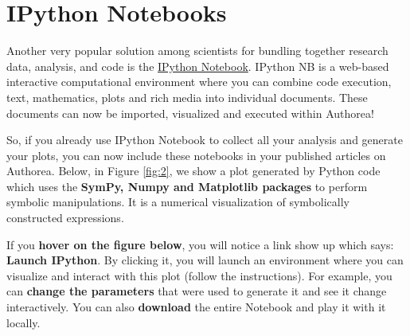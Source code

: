 \section{IPython Notebooks}
Another very popular solution among scientists for bundling together research data, analysis, and code is the \href{http://ipython.org/notebook.html}{IPython Notebook}. IPython NB is a web-based interactive computational environment where you can combine code execution, text, mathematics, plots and rich media into individual documents. These documents can now be imported, visualized and executed within Authorea!

So, if you already use IPython Notebook to collect all your analysis and generate your plots, you can now include these notebooks in your published articles on Authorea. Below, in Figure \ref{fig:2}, we show a plot generated by Python code which uses the \textbf{SymPy, Numpy and Matplotlib packages} to perform symbolic manipulations. It is a numerical visualization of symbolically constructed expressions.

If you \textbf{hover on the figure below}, you will notice a link show up which says: \textbf{Launch IPython}. By clicking it, you will launch an environment where you can visualize and interact with this plot (follow the instructions). For example, you can \textbf{change the parameters} that were used to generate it and see it change interactively. You can also \textbf{download} the entire Notebook and play it with it locally.  